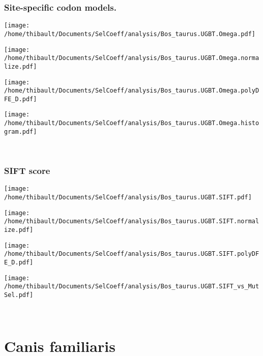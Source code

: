 \subsubsection*{Site-specific codon models.} 
\begin{minipage}{0.49\linewidth} 
\texttt{[image: /home/thibault/Documents/SelCoeff/analysis/Bos\_taurus.UGBT.Omega.pdf]} 
\end{minipage}
\begin{minipage}{0.49\linewidth} 
\texttt{[image: /home/thibault/Documents/SelCoeff/analysis/Bos\_taurus.UGBT.Omega.normalize.pdf]} 
\end{minipage}
\begin{minipage}{0.49\linewidth} 
\texttt{[image: /home/thibault/Documents/SelCoeff/analysis/Bos\_taurus.UGBT.Omega.polyDFE\_D.pdf]} 
\end{minipage}
\begin{minipage}{0.49\linewidth} 
\texttt{[image: /home/thibault/Documents/SelCoeff/analysis/Bos\_taurus.UGBT.Omega.histogram.pdf]} 
\end{minipage}
\\ 
\subsubsection*{SIFT score} 
\begin{minipage}{0.49\linewidth} 
\texttt{[image: /home/thibault/Documents/SelCoeff/analysis/Bos\_taurus.UGBT.SIFT.pdf]} 
\end{minipage}
\begin{minipage}{0.49\linewidth} 
\texttt{[image: /home/thibault/Documents/SelCoeff/analysis/Bos\_taurus.UGBT.SIFT.normalize.pdf]} 
\end{minipage}
\begin{minipage}{0.49\linewidth} 
\texttt{[image: /home/thibault/Documents/SelCoeff/analysis/Bos\_taurus.UGBT.SIFT.polyDFE\_D.pdf]} 
\end{minipage}
\begin{minipage}{0.49\linewidth} 
\texttt{[image: /home/thibault/Documents/SelCoeff/analysis/Bos\_taurus.UGBT.SIFT\_vs\_MutSel.pdf]} 
\end{minipage}
\\ 
\section{Canis familiaris} 
 
